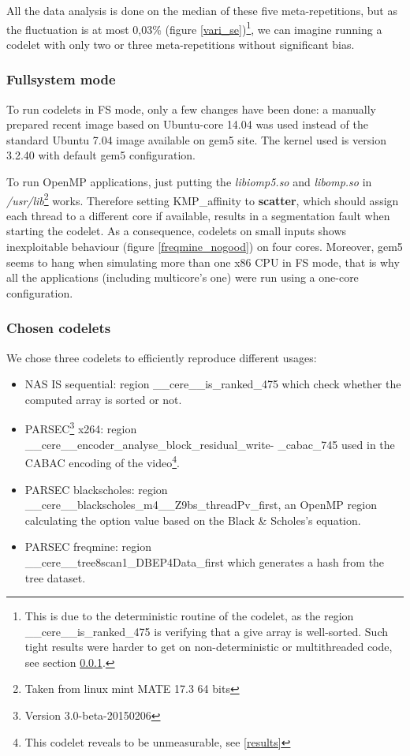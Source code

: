 \documentclass{article}
\begin{document}
\begin{multicols}{2}

All the data analysis is done on the median of these five meta-repetitions, but as the fluctuation is at most 0,03\% (figure \ref{vari_se})\footnote{This is due to the deterministic routine of the codelet, as the region \_\_cere\_\_is\_ranked\_475 is verifying that a give array is well-sorted. Such tight results were harder to get on non-deterministic or multithreaded code, see section \ref{FS_mode}.}, we can imagine running a codelet with only two or three meta-repetitions without significant bias.

\subsubsection{Fullsystem mode}
\label{FS_mode}
To run codelets in FS mode, only a few changes have been done: a manually prepared recent image based on Ubuntu-core 14.04 was used instead of the standard Ubuntu 7.04 image available on gem5 site. The kernel used is version 3.2.40 with default gem5 configuration.


To run OpenMP applications, just putting the \textit{libiomp5.so} and \textit{libomp.so} in \textit{/usr/lib}\footnote{Taken from linux mint MATE 17.3 64 bits} works. Therefore setting KMP\_affinity to \textbf{scatter}, which should assign each thread to a different core if available, results in a segmentation fault when starting the codelet. As a consequence, codelets on small inputs shows inexploitable behaviour (figure \ref{freqmine_nogood}) on four cores.  Moreover, gem5 seems to hang when simulating more than one x86 CPU in FS mode, that is why all the applications (including multicore's one) were run using a one-core configuration.


\subsubsection{Chosen codelets}
We chose three codelets to efficiently reproduce different usages:
\begin{itemize}
\item NAS IS sequential: region \_\_cere\_\_is\_ranked\_475 which check whether the computed array is sorted or not.
\item PARSEC\footnote{Version 3.0-beta-20150206} x264: region \\ \_\_cere\_\_encoder\_analyse\_block\_residual\_write- \_cabac\_745 used in the CABAC encoding of the video\footnote{This codelet reveals to be unmeasurable, see \ref{results}}.
\item PARSEC blackscholes: region \\ \_\_cere\_\_blackscholes\_m4\_\_Z9bs\_threadPv\_first, an OpenMP region calculating the option value based on the Black \& Scholes's equation.
\item PARSEC freqmine: region\\ \_\_cere\_\_tree8scan1\_DBEP4Data\_first which generates a hash from the tree dataset.
\end{itemize}


\end{multicols}
\end{document}
